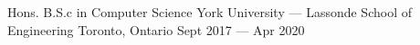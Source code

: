 

\begin{cventries}

  
  \cventrynodesc
    {Hons. B.S.c in Computer Science} %
    {York University — Lassonde School of Engineering} %
    {Toronto, Ontario} %
    {Sept 2017 — Apr 2020} %
    
  

\end{cventries}
